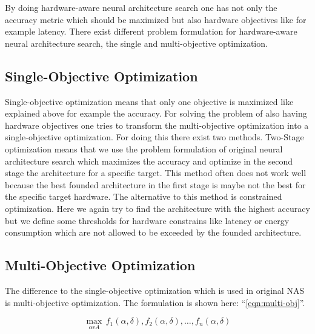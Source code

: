 \documentclass[conference]{IEEEtran}
\begin{document}
By doing hardware-aware neural architecture search one has not only the accuracy metric which should be maximized but also hardware objectives like for example latency. There exist different problem formulation for hardware-aware neural architecture search, the single and multi-objective optimization.

\subsection{Single-Objective Optimization}

Single-objective optimization means that only one objective is maximized like explained above for example the accuracy. For solving the problem of also having hardware objectives one tries to transform the multi-objective optimization into a single-objective optimization. For doing this there exist two methods. Two-Stage optimization means that we use the problem formulation of original neural architecture search which maximizes the accuracy and optimize in the second stage the architecture for a specific target. This method often does not work well because the best founded architecture in the first stage is maybe not the best for the specific target hardware. The alternative to this method is constrained optimization. Here we again try to find the architecture with the highest accuracy but we define some thresholds for hardware constrains like latency or energy consumption which are not allowed to be exceeded by the founded architecture. 

\subsection{Multi-Objective Optimization}

The difference to the single-objective optimization which is used in original NAS is multi-objective optimization. The formulation is shown here: ``\eqref{eqn:multi-obj}''.
 
\begin{equation}
\label{eqn:multi-obj}
\max_{\alpha\epsilon A}\,f_{1}(\alpha, \delta),f_{2}(\alpha, \delta),\ldots ,f_{n}(\alpha, \delta)
\end{equation}     
\end{document}
